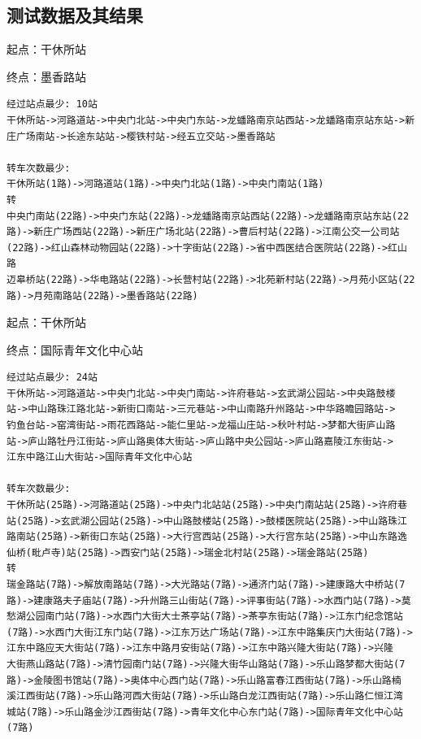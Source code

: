 \documentclass[a4paper,11pt,UTF8]{ctexart}
\begin{document}
\subsection{测试数据及其结果}
起点：干休所站 \par
终点：墨香路站
\begin{lstlisting}[caption=测试用例1,captionpos=b]
经过站点最少: 10站
干休所站->河路道站->中央门北站->中央门东站->龙蟠路南京站西站->龙蟠路南京站东站->新庄广场南站->长途东站站->樱铁村站->经五立交站->墨香路站

转车次数最少:
干休所站(1路)->河路道站(1路)->中央门北站(1路)->中央门南站(1路)
转
中央门南站(22路)->中央门东站(22路)->龙蟠路南京站西站(22路)->龙蟠路南京站东站(22路)->新庄广场西站(22路)->新庄广场北站(22路)->曹后村站(22路)->江南公交一公司站(22路)->红山森林动物园站(22路)->十字街站(22路)->省中西医结合医院站(22路)->红山路
迈皋桥站(22路)->华电路站(22路)->长营村站(22路)->北苑新村站(22路)->月苑小区站(22路)->月苑南路站(22路)->墨香路站(22路)
\end{lstlisting}

起点：干休所站 \par
终点：国际青年文化中心站
\begin{lstlisting}[caption=测试用例2,captionpos=b]
经过站点最少: 24站
干休所站->河路道站->中央门北站->中央门南站->许府巷站->玄武湖公园站->中央路鼓楼
站->中山路珠江路北站->新街口南站->三元巷站->中山南路升州路站->中华路瞻园路站->
钓鱼台站->窑湾街站->雨花西路站->能仁里站->龙福山庄站->秋叶村站->梦都大街庐山路
站->庐山路牡丹江街站->庐山路奥体大街站->庐山路中央公园站->庐山路嘉陵江东街站->
江东中路江山大街站->国际青年文化中心站

转车次数最少:
干休所站(25路)->河路道站(25路)->中央门北站站(25路)->中央门南站站(25路)->许府巷
站(25路)->玄武湖公园站(25路)->中山路鼓楼站(25路)->鼓楼医院站(25路)->中山路珠江
路南站(25路)->新街口东站(25路)->大行宫西站(25路)->大行宫东站(25路)->中山东路逸
仙桥(毗卢寺)站(25路)->西安门站(25路)->瑞金北村站(25路)->瑞金路站(25路)
转
瑞金路站(7路)->解放南路站(7路)->大光路站(7路)->通济门站(7路)->建康路大中桥站(7
路)->建康路夫子庙站(7路)->升州路三山街站(7路)->评事街站(7路)->水西门站(7路)->莫
愁湖公园南门站(7路)->水西门大街大士茶亭站(7路)->茶亭东街站(7路)->江东门纪念馆站
(7路)->水西门大街江东门站(7路)->江东万达广场站(7路)->江东中路集庆门大街站(7路)->江东中路应天大街站(7路)->江东中路月安街站(7路)->江东中路兴隆大街站(7路)->兴隆
大街燕山路站(7路)->清竹园南门站(7路)->兴隆大街华山路站(7路)->乐山路梦都大街站(7路)->金陵图书馆站(7路)->奥体中心西门站(7路)->乐山路富春江西街站(7路)->乐山路楠
溪江西街站(7路)->乐山路河西大街站(7路)->乐山路白龙江西街站(7路)->乐山路仁恒江湾
城站(7路)->乐山路金沙江西街站(7路)->青年文化中心东门站(7路)->国际青年文化中心站
(7路)
\end{lstlisting}
\end{document}
